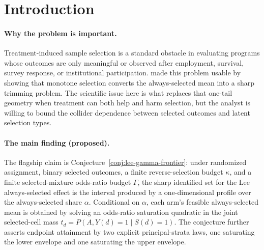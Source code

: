 \documentclass[11pt]{article}
\theoremstyle{definition}
\theoremstyle{plain}
\theoremstyle{remark}
\begin{document}
\section{Introduction}
\paragraph{Why the problem is important.}
Treatment-induced sample selection is a standard obstacle in evaluating programs whose outcomes are only meaningful or observed after employment, survival, survey response, or institutional participation.  \citet{Lee2009SampleSelection} made this problem usable by showing that monotone selection converts the always-selected mean into a sharp trimming problem.  The scientific issue here is what replaces that one-tail geometry when treatment can both help and harm selection, but the analyst is willing to bound the collider dependence between selected outcomes and latent selection types.

\paragraph{The main finding (proposed).}
The flagship claim is Conjecture~\ref{conj:lee-gamma-frontier}: under randomized assignment, binary selected outcomes, a finite reverse-selection budget \(\kappa\), and a finite selected-mixture odds-ratio budget \(\Gamma\), the sharp identified set for the Lee always-selected effect is the interval produced by a one-dimensional profile over the always-selected share \(\alpha\).  Conditional on \(\alpha\), each arm's feasible always-selected mean is obtained by solving an odds-ratio saturation quadratic in the joint selected-cell mass \(t_d=P(A,Y(d)=1\mid S(d)=1)\).  The conjecture further asserts endpoint attainment by two explicit principal-strata laws, one saturating the lower envelope and one saturating the upper envelope.
\end{document}
